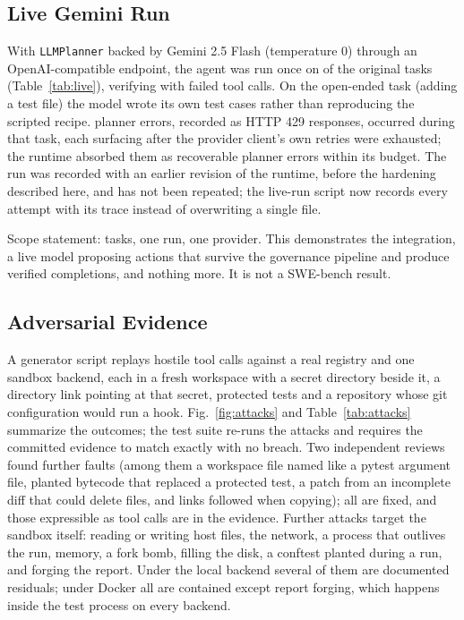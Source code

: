 \documentclass[conference]{IEEEtran}
\begin{document}
\subsection{Live Gemini Run}
With \texttt{LLMPlanner} backed by Gemini 2.5 Flash (temperature 0) through
an OpenAI-compatible endpoint, the agent was run once on \LiveTasks{} of the original
tasks (Table~\ref{tab:live}), verifying \LiveVerified{} with
\LiveFailedCalls{} failed tool calls. On the open-ended task (adding a test
file) the model wrote its own test cases rather than reproducing the
scripted recipe. \LivePlannerErrors{} planner errors, recorded as HTTP 429
responses, occurred during that task, each surfacing after the provider
client's own retries were exhausted; the runtime absorbed them as recoverable planner errors
within its budget. The run was recorded with an earlier revision of the
runtime, before the hardening described here, and has not been repeated;
the live-run script now records every attempt with its trace instead of
overwriting a single file.

\begin{table}[t]
\centering
\caption{Live planner run (Gemini 2.5 Flash, one run). One planner instance
was shared across both tasks and never reset its counters, so the committed
file first reported cumulative values for the second task; the values shown
are per task, computed from those recorded counters.}
\label{tab:live}
\footnotesize

\end{table}

Scope statement: \LiveTasks{} tasks, one run, one provider. This demonstrates the
integration, a live model proposing actions that survive the governance
pipeline and produce verified completions, and nothing more. It is not a
SWE-bench result.

\subsection{Adversarial Evidence}
A generator script replays hostile tool calls against a real registry and
one sandbox backend,
each in a fresh workspace with a secret directory beside it, a directory
link pointing at that secret, protected tests and a repository whose git
configuration would run a hook. Fig.~\ref{fig:attacks} and
Table~\ref{tab:attacks} summarize the outcomes; the test suite re-runs the attacks and requires the committed
evidence to match exactly with no breach. Two independent reviews found
further faults (among them a workspace file named like a pytest argument
file, planted bytecode that replaced a protected test, a patch from an
incomplete diff that could delete files, and links followed when copying);
all are fixed, and those expressible as tool calls are in the evidence.
Further attacks target the sandbox itself: reading or writing host files,
the network, a process that outlives the run, memory, a fork bomb, filling
the disk, a conftest planted during a run, and forging the report. Under the
local backend several of them are documented residuals; under Docker all are
contained except report forging, which happens inside the test process on
every backend.
\end{document}

